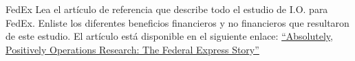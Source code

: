 \begin{frameact}{FedEx}
  Lea el artículo de referencia que describe todo el estudio de I.O. para FedEx. Enliste los diferentes beneficios financieros y no financieros que resultaron de este estudio. El artículo está disponible en el siguiente enlace: \href{https://drive.google.com/file/d/1b8VCLpjFeBWOssiuRRNjnjSkSGwoGaA9/view?usp=sharing}{“Absolutely, Positively Operations Research: The Federal Express Story”}
\end{frameact}


